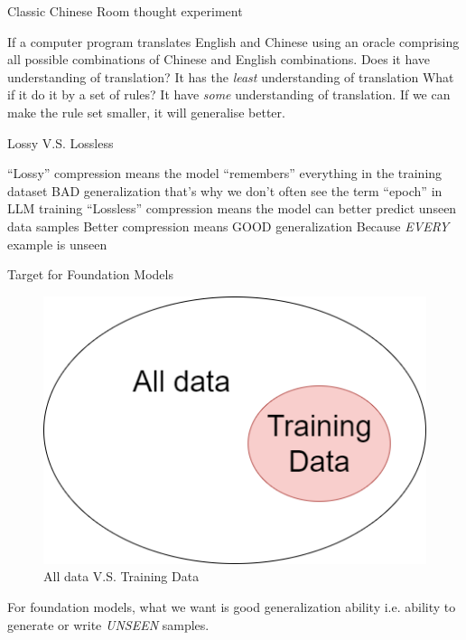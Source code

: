 \documentclass[scheme=plain]{ctexbeamer}
\begin{document}
\begin{frame}{Classic Chinese Room thought experiment}
  \begin{outline}
    \1 If a computer program translates English and Chinese using an oracle comprising all possible combinations of Chinese and English combinations.
      \2 Does it have understanding of translation?
    \pause
      \2 It has the \emph{least} understanding of translation
    \pause
    \1 What if it do it by a set of rules?
      \2 It have \emph{some} understanding of translation.
    \pause
    \1 If we can make the rule set smaller, it will generalise better.
  \end{outline}
\end{frame}

\begin{frame}{Lossy V.S. Lossless}
  \begin{outline}
    \1 ``Lossy'' compression means the model ``remembers'' everything in the training dataset
      \2 BAD generalization
      \2 that's why we don't often see the term ``epoch'' in LLM training
    \1 ``Lossless'' compression means the model can better predict unseen data samples
      \2 Better compression means GOOD generalization
        \3 Because \emph{EVERY} example is unseen
  \end{outline}
\end{frame}

\begin{frame}{Target for Foundation Models}
  \begin{figure}
    \includegraphics[width=.6\linewidth]{target_for_foundation_models.drawio.png}
    \caption{All data V.S. Training Data}
  \end{figure}
  \begin{outline}
    \1 For foundation models, what we want is good generalization ability
      \2 i.e. ability to generate or write \emph{UNSEEN} samples.
  \end{outline}
\end{frame}
\end{document}
